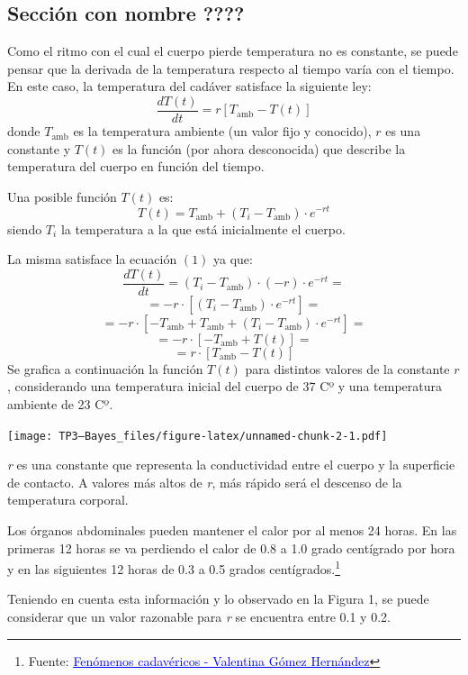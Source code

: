 \documentclass[
]{article}
\begin{document}
\hypertarget{secciuxf3n-con-nombre}{%
\subsection{Sección con nombre ????}\label{secciuxf3n-con-nombre}}

Como el ritmo con el cual el cuerpo pierde temperatura no es constante,
se puede pensar que la derivada de la temperatura respecto al tiempo
varía con el tiempo. En este caso, la temperatura del cadáver satisface
la siguiente ley:
\[ \frac{dT(t)}{dt} = r[T_{\text{amb}}-T(t)] \tag{1} \] donde
\(T_{\text{amb}}\) es la temperatura ambiente (un valor fijo y
conocido), \(r\) es una constante y \(T(t)\) es la función (por ahora
desconocida) que describe la temperatura del cuerpo en función del
tiempo.

Una posible función \(T(t)\) es:
\[ T(t)=T_{\text{amb}} + (T_i - T_{\text{amb}}) \cdot e^{-rt} \] siendo
\(T_i\) la temperatura a la que está inicialmente el cuerpo.

La misma satisface la ecuación \((1)\) ya que:
\[ \frac{dT(t)}{dt} = (T_i - T_{\text{amb}}) \cdot (-r) \cdot e^{-rt} = \]
\[ = -r \cdot [(T_i - T_{\mathrm{amb}}) \cdot e^{-rt}] = \]
\[ = -r \cdot [-T_{\mathrm{amb}}+T_{\mathrm{amb}}+(T_i - T_{\mathrm{amb}}) \cdot e^{-rt}] = \]
\[ = -r \cdot [-T_{\mathrm{amb}}+T(t)] = \]
\[ = r \cdot [T_{\mathrm{amb}} - T(t)] \] Se grafica a continuación la
función \(T(t)\) para distintos valores de la constante \(r\),
considerando una temperatura inicial del cuerpo de 37 Cº y una
temperatura ambiente de 23 Cº.

\texttt{[image: TP3---Bayes\_files/figure-latex/unnamed-chunk-2-1.pdf]}

\emph{r} es una constante que representa la conductividad entre el
cuerpo y la superficie de contacto. A valores más altos de \emph{r}, más
rápido será el descenso de la temperatura corporal.

Los órganos abdominales pueden mantener el calor por al menos 24 horas.
En las primeras 12 horas se va perdiendo el calor de 0.8 a 1.0 grado
centígrado por hora y en las siguientes 12 horas de 0.3 a 0.5 grados
centígrados.\footnote{Fuente:
  \href{https://repository.unad.edu.co/bitstream/handle/10596/51040/vgomezh.pdf?sequence=3\&isAllowed=y\#:~:text=Enfriamiento\%20Cadav\%C3\%A9rico\%20o\%20Algor\%20Mortis,equilibra\%20con\%20el\%20medio\%20ambiente.}{\textcolor{blue}{\underline{Fenómenos cadavéricos - Valentina Gómez Hernández}}}}

Teniendo en cuenta esta información y lo observado en la Figura 1, se
puede considerar que un valor razonable para \emph{r} se encuentra entre
0.1 y 0.2.
\end{document}
